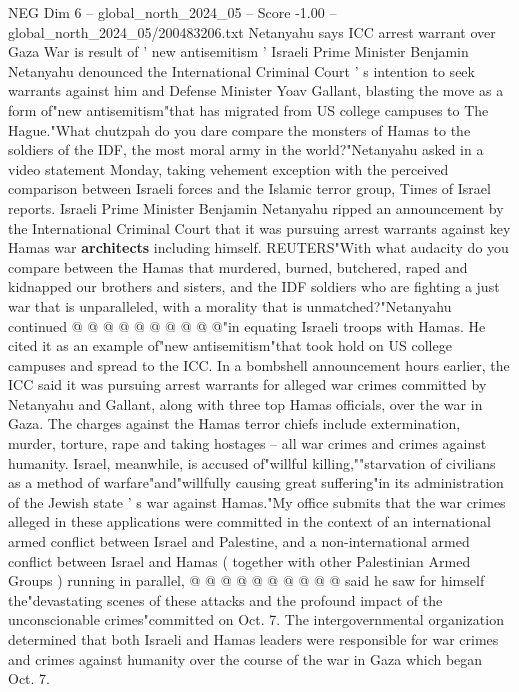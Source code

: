 \begin{textsample}{NEG Dim 6 – global\_north\_2024\_05 – Score -1.00 – global\_north\_2024\_05/200483206.txt}  \label{ex:f6_neg_299}
Netanyahu says ICC arrest warrant over Gaza War is result of ' new antisemitism ' Israeli Prime Minister Benjamin Netanyahu denounced the International Criminal Court ' s intention to seek warrants against him and Defense Minister Yoav Gallant, blasting the move as a form of"new antisemitism"that has migrated from US college campuses to The Hague."What chutzpah do you dare compare the monsters of Hamas to the soldiers of the IDF, the most moral army in the world?"Netanyahu asked in a video statement Monday, taking vehement exception with the perceived comparison between Israeli forces and the Islamic terror group, Times of Israel reports.
Israeli Prime Minister Benjamin Netanyahu ripped an announcement by the International Criminal Court that it was pursuing arrest warrants against key Hamas war \textbf{architects} including himself.
REUTERS"With what audacity do you compare between the Hamas that murdered, burned, butchered, raped and kidnapped our brothers and sisters, and the IDF soldiers who are fighting a just war that is unparalleled, with a morality that is unmatched?"Netanyahu continued @ @ @ @ @ @ @ @ @ @"in equating Israeli troops with Hamas.
He cited it as an example of"new antisemitism"that took hold on US college campuses and spread to the ICC.
In a bombshell announcement hours earlier, the ICC said it was pursuing arrest warrants for alleged war crimes committed by Netanyahu and Gallant, along with three top Hamas officials, over the war in Gaza.
The charges against the Hamas terror chiefs include extermination, murder, torture, rape and taking hostages -- all war crimes and crimes against humanity.
Israel, meanwhile, is accused of"willful killing,""starvation of civilians as a method of warfare"and"willfully causing great suffering"in its administration of the Jewish state ' s war against Hamas."My office submits that the war crimes alleged in these applications were committed in the context of an international armed conflict between Israel and Palestine, and a non-international armed conflict between Israel and Hamas ( together with other Palestinian Armed Groups ) running in parallel, @ @ @ @ @ @ @ @ @ @ said he saw for himself the"devastating scenes of these attacks and the profound impact of the unconscionable crimes"committed on Oct. 7.
The intergovernmental organization determined that both Israeli and Hamas leaders were responsible for war crimes and crimes against humanity over the course of the war in Gaza which began Oct. 7.

\end{textsample}
